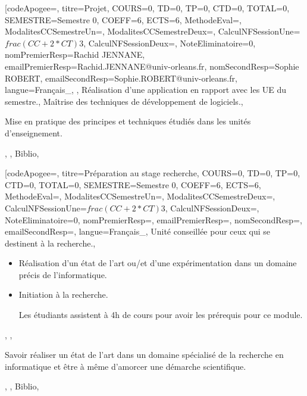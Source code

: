 \module[codeApogee={},
titre={Projet},
COURS={0},
TD={0},
TP={0},
CTD={0},
TOTAL={0},
SEMESTRE={Semestre 0},
COEFF={6},
ECTS={6},
MethodeEval={},
ModalitesCCSemestreUn={},
ModalitesCCSemestreDeux={},
CalculNFSessionUne={$frac{(CC+2*CT)}{3}$},
CalculNFSessionDeux={},
NoteEliminatoire={0},
nomPremierResp={Rachid JENNANE},
emailPremierResp={Rachid.JENNANE@univ-orleans.fr},
nomSecondResp={Sophie ROBERT},
emailSecondResp={Sophie.ROBERT@univ-orleans.fr},
langue={Français_},
{},
{Réalisation d'une application en rapport avec les UE du semestre.},
{Maîtrise des techniques de développement de logiciels.},
{\begin{itemize}
\ObjItem Mise en pratique des principes et techniques étudiés dans les unités d'enseignement.
\end{itemize}},
{},
{Biblio},

\vfill


\module[codeApogee={},
titre={Préparation au stage recherche},
COURS={0},
TD={0},
TP={0},
CTD={0},
TOTAL={0},
SEMESTRE={Semestre 0},
COEFF={6},
ECTS={6},
MethodeEval={},
ModalitesCCSemestreUn={},
ModalitesCCSemestreDeux={},
CalculNFSessionUne={$frac{(CC+2*CT)}{3}$},
CalculNFSessionDeux={},
NoteEliminatoire={0},
nomPremierResp={},
emailPremierResp={},
nomSecondResp={},
emailSecondResp={},
langue={Français_},
{Unité conseillée pour ceux qui se destinent à la recherche.},
{\begin{itemize}
\item Réalisation d'un état de l'art ou/et d'une expérimentation dans un domaine précis de l'informatique.
\item Initiation à la recherche.
 
Les étudiants assistent à 4h de cours pour avoir les prérequis pour ce module.
\end{itemize}},
{},
{\begin{itemize}
\ObjItem Savoir réaliser un état de l'art dans un domaine spécialisé de la recherche en informatique et être à même d'amorcer une démarche scientifique.
\end{itemize}},
{},
{Biblio},

\vfill



